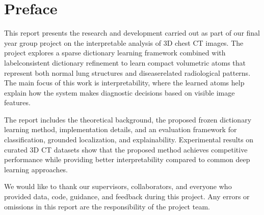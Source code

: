 ﻿
\chapter*{Preface}


This report presents the research and development carried out as part of our final year group project on the interpretable analysis of 3D chest CT images. The project explores a sparse dictionary learning framework combined with labelconsistent dictionary refinement to learn compact volumetric atoms that represent both normal lung structures and diseaserelated radiological patterns. The main focus of this work is interpretability, where the learned atoms help explain how the system makes diagnostic decisions based on visible image features.

The report includes the theoretical background, the proposed frozen dictionary learning method, implementation details, and an evaluation framework for classification, grounded localization, and explainability. Experimental results on curated 3D CT datasets show that the proposed method achieves competitive performance while providing better interpretability compared to common deep learning approaches.

We would like to thank our supervisors, collaborators, and everyone who provided data, code, guidance, and feedback during this project. Any errors or omissions in this report are the responsibility of the project team.
